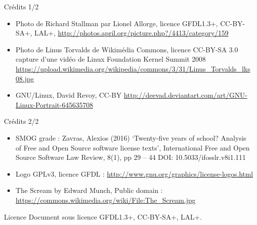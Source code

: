 \documentclass{beamer}
\begin{document}
\begin{frame}{Crédits 1/2}
  \begin{itemize}
  \item Photo de Richard Stallman par Lionel Allorge, licence GFDL1.3+, CC-BY-SA+, LAL+,  \url{http://photos.april.org/picture.php?/4413/category/159}
  \item Photo de Linus Torvalds de Wikimédia Commons, licence CC-BY-SA 3.0 capture d'une vidéo de Linux Foundation Kernel Summit 2008 \url{https://upload.wikimedia.org/wikipedia/commons/3/31/Linus_Torvalds_lks08.jpg}
  \item GNU/Linux, David Revoy, CC-BY \url{http://deevad.deviantart.com/art/GNU-Linux-Portrait-645635708}
   \end{itemize}
\end{frame}


\begin{frame}{Crédits 2/2}
  \begin{itemize}
\item SMOG grade : Zavras, Alexios (2016) ‘Twenty-five years of school? Analysis of Free and Open Source software license texts’, International Free and Open Source Software Law Review, 8(1),
pp 29 – 44 DOI: 10.5033/ifosslr.v8i1.111  
\item Logo GPLv3, licence GFDL : \url{http://www.gnu.org/graphics/license-logos.html}
\item The Scream by Edward Munch, Public domain : \url{https://commons.wikimedia.org/wiki/File:The_Scream.jpg}

  \end{itemize}
\end{frame}



\begin{frame}{Licence}
  Document sous licence GFDL1.3+, CC-BY-SA+, LAL+.
\end{frame}
\end{document}
